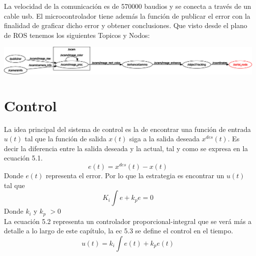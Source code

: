 La velocidad de la comunicación es de 570000 baudios y se conecta a través de un cable usb. El microcontrolador tiene además
la función de publicar el error con la finalidad de graficar dicho error y obtener conclusiones. Que visto desde el plano
de ROS tenemos los siguientes Topicos y Nodos:
\begin{center}
	\includegraphics[width=1.0\textwidth]{Contenido/Cuerpo/Capitulo5/Fig3.eps}
	\label{Fig4}
\end{center}




\section{Control}
La idea principal del sistema de control es la de encontrar una función de entrada $u(t)$ tal que la función de salida $x(t)$ siga a la
salida deseada $x^{des}(t)$. Es decir la diferencia entre la salida deseada y la actual, tal y como se expresa en la ecuación 5.1.
\begin{equation}
	e(t) = x^{des}(t) - x(t)
\end{equation}
Donde $e(t)$ representa el error. Por lo que la estrategia es encontrar un $u(t)$ tal que
\begin{equation}
	K_i\int e + k_pe = 0
\end{equation}
Donde $k_i$ y $k_p$ $> 0$\\
La ecuación 5.2 representa un controlador proporcional-integral que se verá más a detalle a lo largo de este capítulo, la ec 5.3 se define el control en el tiempo.
\begin{equation}
	u(t) = k_i\int{e}(t) + k_pe(t)
\end{equation}


